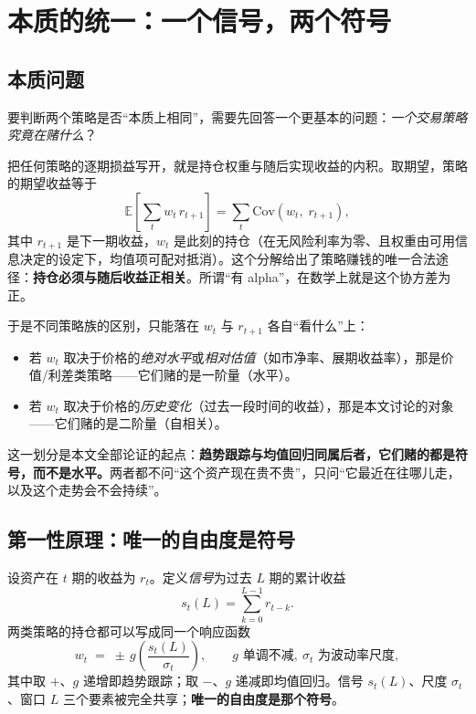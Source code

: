 \section{本质的统一：一个信号，两个符号}\label{sec:unity}

\subsection{本质问题}

要判断两个策略是否“本质上相同”，需要先回答一个更基本的问题：\emph{一个交易策略究竟在赌什么}？

把任何策略的逐期损益写开，就是持仓权重与随后实现收益的内积。取期望，策略的期望收益等于
\begin{equation}
\mathbb{E}\!\left[\sum_t w_t\, r_{t+1}\right]
=\sum_t \mathrm{Cov}\!\left(w_t,\; r_{t+1}\right),
\end{equation}
其中 $r_{t+1}$ 是下一期收益，$w_t$ 是此刻的持仓（在无风险利率为零、且权重由可用信息决定的设定下，均值项可配对抵消）。这个分解给出了策略赚钱的唯一合法途径：\textbf{持仓必须与随后收益正相关}。所谓“有 alpha”，在数学上就是这个协方差为正。

于是不同策略族的区别，只能落在 $w_t$ 与 $r_{t+1}$ 各自“看什么”上：

\begin{itemize}[leftmargin=2.2em]
  \item 若 $w_t$ 取决于价格的\emph{绝对水平}或\emph{相对估值}（如市净率、展期收益率），那是价值/利差类策略——它们赌的是一阶量（水平）。
  \item 若 $w_t$ 取决于价格的\emph{历史变化}（过去一段时间的收益），那是本文讨论的对象——它们赌的是二阶量（自相关）。
\end{itemize}

这一划分是本文全部论证的起点：\textbf{趋势跟踪与均值回归同属后者，它们赌的都是符号，而不是水平。}两者都不问“这个资产现在贵不贵”，只问“它最近在往哪儿走，以及这个走势会不会持续”。

\subsection{第一性原理：唯一的自由度是符号}

设资产在 $t$ 期的收益为 $r_t$。定义\emph{信号}为过去 $L$ 期的累计收益
\begin{equation}
s_t(L)=\sum_{k=0}^{L-1} r_{t-k}.
\end{equation}
两类策略的持仓都可以写成同一个响应函数
\begin{equation}
w_t \;=\; \pm\, g\!\left(\frac{s_t(L)}{\sigma_t}\right),
\qquad g \text{ 单调不减},\ \sigma_t \text{ 为波动率尺度},
\end{equation}
其中取 $+$、$g$ 递增即趋势跟踪；取 $-$、$g$ 递减即均值回归。信号 $s_t(L)$、尺度 $\sigma_t$、窗口 $L$ 三个要素被完全共享；\textbf{唯一的自由度是那个符号}。

